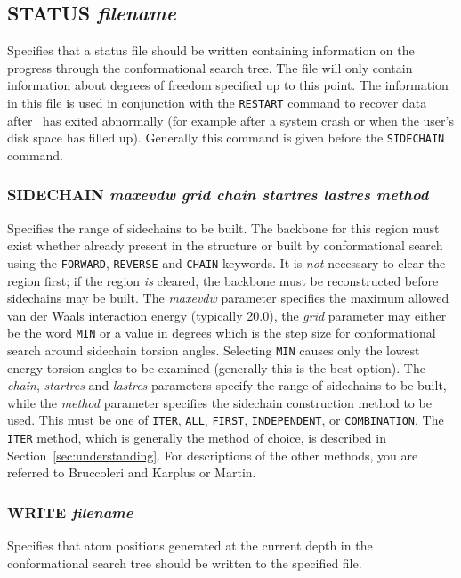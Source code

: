 \subsection{STATUS {\em filename}}
Specifies that a status file should be written containing information on
the progress through the conformational search tree. The file will only
contain information about degrees of freedom specified up to this point.
The information in this file is used in conjunction with the {\tt RESTART}
command to recover data after \cs\ has exited abnormally (for example after
a system crash or when the user's disk space has filled up). Generally this
command is given before the {\tt SIDECHAIN} command.

\subsubsection{SIDECHAIN {\em maxevdw grid chain startres lastres method}}
Specifies the range of sidechains to be built. The backbone for this region
must exist whether already present in the structure or built by conformational
search using the {\tt FORWARD}, {\tt REVERSE} and {\tt CHAIN} keywords. It
is {\em not\/} necessary to clear the region first; if the region {\em is\/}
cleared, the backbone must be reconstructed before sidechains may be built.
The {\em maxevdw\/}
parameter specifies the maximum allowed van der Waals interaction energy
(typically 20.0), the {\em grid\/} parameter may either be the word {\tt MIN} 
or a value in degrees which is the step size for conformational search around
sidechain torsion angles. Selecting {\tt MIN} causes only the lowest energy
torsion angles to be examined (generally this is the best option). 
The {\em chain}, {\em startres} and {\em lastres} parameters specify the 
range of sidechains to be built, while the {\em method} parameter specifies
the sidechain construction method to be used. This must be one of {\tt ITER},
{\tt ALL}, {\tt FIRST}, {\tt INDEPENDENT}, or {\tt COMBINATION}. The {\tt
ITER} method, which is generally the method of choice, is described in 
Section~\ref{sec:understanding}. For descriptions of the other methods,
you are referred to Bruccoleri and Karplus\cite{bruc:congen} or
Martin\cite{martin:thesis}.

\subsubsection{WRITE {\em filename}}
\es
Specifies that atom positions generated at the current depth in the 
conformational search tree should be written to the specified file.

